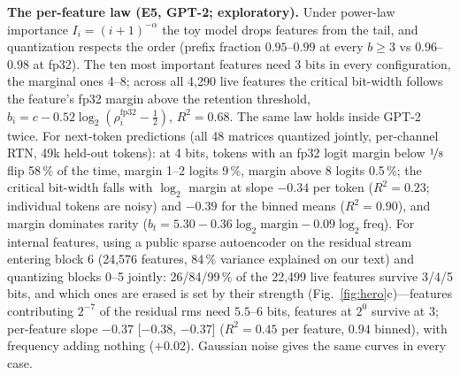 \documentclass{article}
\begin{document}
\textbf{The per-feature law (E5, GPT-2; exploratory).} Under power-law importance $I_i=(i+1)^{-\alpha}$ the toy model drops features
from the tail, and quantization respects the order (prefix fraction $0.95$--$0.99$ at every $b\ge3$ vs $0.96$--$0.98$ at
fp32). The ten most important features need 3 bits in every configuration, the marginal ones 4--8; across all 4{,}290
live features the critical bit-width follows the feature's fp32 margin above the retention threshold, $b_i = c -
0.52\log_2(\rho_i^{\mathrm{fp32}}-\tfrac12)$, $R^2 = 0.68$. The same law holds inside GPT-2 twice. For next-token
predictions (all 48 matrices quantized jointly, per-channel RTN, 49k held-out tokens): at 4 bits, tokens with an fp32
logit margin below $\nicefrac18$ flip 58\,\% of the time, margin 1--2 logits 9\,\%, margin above 8 logits 0.5\,\%; the
critical bit-width falls with $\log_2$ margin at slope $-0.34$ per token ($R^2=0.23$; individual tokens are noisy) and
$-0.39$ for the binned means ($R^2=0.90$), and margin dominates rarity
($b_t = 5.30-0.36\log_2\mathrm{margin}-0.09\log_2\mathrm{freq}$). For internal features, using a public sparse autoencoder on
the residual stream entering block 6 (24{,}576 features, 84\,\% variance explained on our text) and quantizing blocks 0--5
jointly: 26/84/99\,\% of the 22{,}499 live features survive 3/4/5 bits, and which ones are erased is set by their
strength (Fig.~\ref{fig:hero}c)---features contributing $2^{-7}$ of the residual rms need $5.5$--$6$ bits, features at
$2^{0}$ survive at 3; per-feature slope $-0.37$ [$-0.38$, $-0.37$] ($R^2 = 0.45$ per feature, $0.94$ binned), with
frequency adding nothing ($+0.02$). Gaussian noise gives the same curves in every case.
\end{document}
